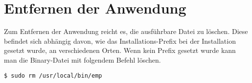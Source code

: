 
\section{Entfernen der Anwendung}

Zum Entfernen der Anwendung reicht es, die ausführbare Datei zu löschen.
Diese befindet sich abhängig davon, wie das Installations-Prefix bei der Installation gesetzt wurde, an
verschiedenen Orten.
Wenn kein Prefix gesetzt wurde kann man die Binary-Datei mit folgendem Befehl löschen.

\begin{lstlisting}[style=Bash]
$ sudo rm /usr/local/bin/emp
\end{lstlisting}

